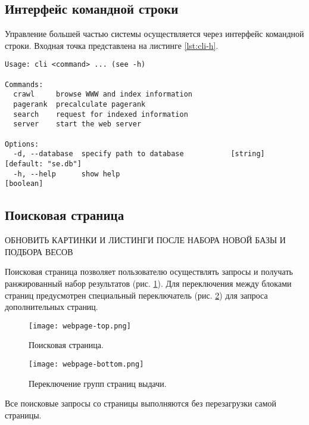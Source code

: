 \subsection*{Интерфейс командной строки}
Управление большей частью системы осуществляется через интерфейс командной строки. Входная точка представлена на листинге \ref{lst:cli-h}.
\begin{lstlisting}[caption=Интерфейс командной строки., label=lst:cli-h]
Usage: cli <command> ... (see -h)

Commands:
  crawl     browse WWW and index information
  pagerank  precalculate pagerank
  search    request for indexed information
  server    start the web server

Options:
  -d, --database  specify path to database           [string] [default: "se.db"]
  -h, --help      show help                                            [boolean]
\end{lstlisting}


\subsection*{Поисковая страница}
{\Large ОБНОВИТЬ КАРТИНКИ И ЛИСТИНГИ ПОСЛЕ НАБОРА НОВОЙ БАЗЫ И ПОДБОРА ВЕСОВ}

Поисковая страница позволяет пользователю осуществлять запросы и получать ранжированный набор результатов (рис. \ref{fig:webpage-top}). Для переключения между блоками страниц предусмотрен специальный переключатель (рис. \ref{fig:webpage-bottom}) для запроса дополнительных страниц.

\begin{figure}[h]
  \centering
  \texttt{[image: webpage-top.png]}
  \caption{Поисковая страница.}
  \label{fig:webpage-top}
\end{figure}

\begin{figure}[h]
  \centering
  \texttt{[image: webpage-bottom.png]}
  \caption{Переключение групп страниц выдачи.}
  \label{fig:webpage-bottom}
\end{figure}

Все поисковые запросы со страницы выполняются без перезагрузки самой страницы.


